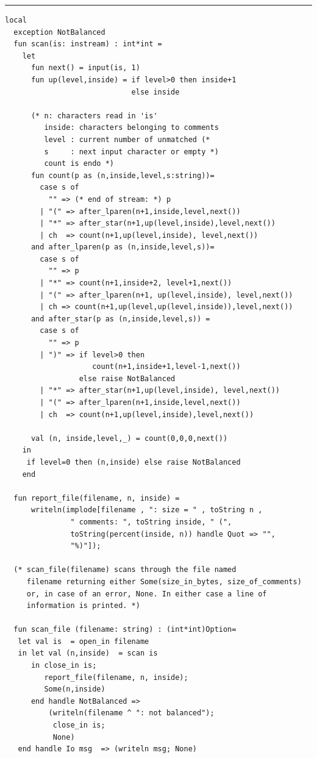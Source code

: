 \documentclass[12pt]{book}
\begin{document}
\bigskip
\hrule
\begin{verbatim}
local
  exception NotBalanced
  fun scan(is: instream) : int*int =
    let
      fun next() = input(is, 1)
      fun up(level,inside) = if level>0 then inside+1 
                             else inside

      (* n: characters read in 'is'
         inside: characters belonging to comments
         level : current number of unmatched (* 
         s     : next input character or empty *)
         count is endo *)
      fun count(p as (n,inside,level,s:string))=
        case s of
          "" => (* end of stream: *) p  
        | "(" => after_lparen(n+1,inside,level,next())
        | "*" => after_star(n+1,up(level,inside),level,next())
        | ch  => count(n+1,up(level,inside), level,next())
      and after_lparen(p as (n,inside,level,s))=
        case s of
          "" => p
        | "*" => count(n+1,inside+2, level+1,next())
        | "(" => after_lparen(n+1, up(level,inside), level,next())
        | ch => count(n+1,up(level,up(level,inside)),level,next())
      and after_star(p as (n,inside,level,s)) =
        case s of
          "" => p
        | ")" => if level>0 then
                    count(n+1,inside+1,level-1,next())
                 else raise NotBalanced
        | "*" => after_star(n+1,up(level,inside), level,next())
        | "(" => after_lparen(n+1,inside,level,next())
        | ch  => count(n+1,up(level,inside),level,next())
    
      val (n, inside,level,_) = count(0,0,0,next())
    in
     if level=0 then (n,inside) else raise NotBalanced
    end
  
  fun report_file(filename, n, inside) = 
      writeln(implode[filename , ": size = " , toString n , 
               " comments: ", toString inside, " (",
               toString(percent(inside, n)) handle Quot => "", 
               "%)"]);

  (* scan_file(filename) scans through the file named
     filename returning either Some(size_in_bytes, size_of_comments)
     or, in case of an error, None. In either case a line of
     information is printed. *)

  fun scan_file (filename: string) : (int*int)Option=
   let val is  = open_in filename 
   in let val (n,inside)  = scan is
      in close_in is; 
         report_file(filename, n, inside);
         Some(n,inside)
      end handle NotBalanced => 
          (writeln(filename ^ ": not balanced");
           close_in is;
           None)
   end handle Io msg  => (writeln msg; None)
  

\end{verbatim}
\end{document}
